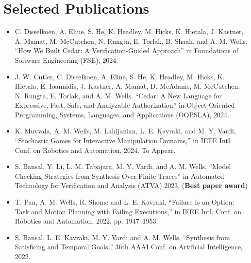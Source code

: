 \section{Selected Publications}

\vspace{8pt}

\begin{itemize}

\item[]{C. Disselkoen, A. Eline, S. He, K. Headley, M. Hicks, K. Hietala, J. Kastner, A. Mamat, M. McCutchen, N. Rungta, E. Torlak, B. Shaah, and A. M. Wells. ``How We Built Cedar: A Verification-Guided Approach'' in Foundations of Software Engineering (FSE), 2024.}

\vspace{8pt} 

\item[]{J. W. Cutler, C. Disselkoen, A. Eline, S. He, K. Headley, M. Hicks, K. Hietala, E. Ioannidis, J. Kastner, A. Mamat, D. McAdams, M. McCutchen, N. Rungta, E. Torlak, and A. M. Wells. ``Cedar: A New Language for Expressive, Fast, Safe, and Analyzable Authorization'' in Object-Oriented Programming, Systems, Languages, and Applications (OOPSLA), 2024.}

\vspace{8pt} 

\item[]{K. Muvvala, A. M. Wells, M. Lahijanian, L. E. Kavraki, and M. Y. Vardi, ``Stochastic Games for Interactive Manipulation Domains,'' in IEEE Intl. Conf. on Robotics and Automation, 2024. To Appear.}

\vspace{8pt} 

\item[]{S. Bansal, Y. Li, L. M. Tabajara, M. Y. Vardi, and A. M. Wells, ``Model Checking Strategies from Synthesis Over Finite Traces'' in Automated Technology for Verification and Analysis (ATVA) 2023. (\textbf{Best paper award})}

\vspace{8pt} 

\item[]{T. Pan, A. M. Wells, R. Shome and L. E. Kavraki, ``Failure Is an Option: Task and Motion Planning with Failing Executions,'' in IEEE Intl. Conf. on Robotics and Automation, 2022, pp. 1947–1953.}

\vspace{8pt} 

\item[]{S. Bansal, L. E. Kavraki, M. Y. Vardi and A. M. Wells, ``Synthesis from Satisficing and Temporal Goals,'' 36th AAAI Conf. on Artificial Intelligence, 2022.}


\end{itemize}
